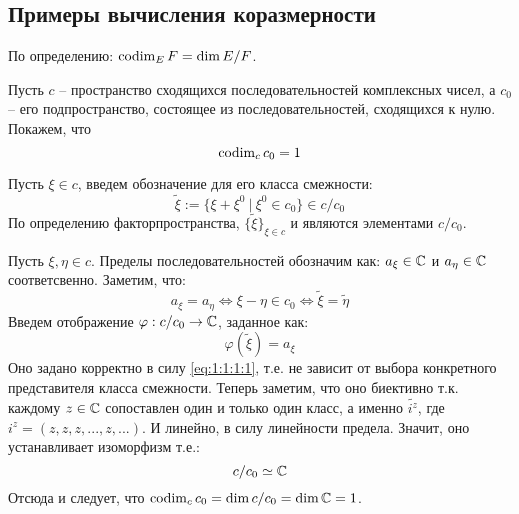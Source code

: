 \documentclass[../main.tex]{subfiles}
\begin{document}
\subsection{Примеры вычисления коразмерности}

По определению: $\operatorname{codim}_E F = \dim{E / F}$. 

\begin{example}
	Пусть $c$ -- пространство сходящихся последовательностей комплексных чисел, а $c_0$ -- его подпространство, состоящее из последовательностей, сходящихся к нулю. Покажем, что
	\begin{equation}
		\operatorname{codim}_{c}{c_0} = 1
	\end{equation}
	
	Пусть $\xi \in c$, введем обозначение для его класса смежности:
	$$\tilde{\xi} := \{\xi + \xi^0 \ | \ \xi^0 \in c_0\} \in c / c_0$$
	По определению факторпространства, $\{\tilde{\xi}\}_{\xi \in c}$ и являются элементами $c / c_0$. 
	
	Пусть $\xi, \eta \in c$. Пределы последовательностей обозначим как: $a_\xi \in \mathbb{C}$ и $a_\eta \in \mathbb{C}$ соответсвенно. Заметим, что:
	\begin{equation}\label{eq:1:1:1:1}
		a_\xi = a_\eta \Leftrightarrow \xi - \eta \in c_0 \Leftrightarrow \tilde{\xi} = \tilde{\eta}
	\end{equation}
	Введем отображение $\varphi : c / c_0 \to \mathbb{C}$, заданное как:
	$$\varphi(\tilde{\xi}) = a_\xi$$
	Оно задано корректно в силу \eqref{eq:1:1:1:1}, т.е. не зависит от выбора конкретного представителя класса смежности. Теперь заметим, что оно биективно т.к. каждому $z \in \mathbb{C}$ сопоставлен один и только один класс, а именно $\tilde{i^z}$, где $i^z = (z, z, z, ..., z, ...)$. И линейно, в силу линейности предела. Значит, оно устанавливает изоморфизм т.е.:
	$$c / c_0 \simeq \mathbb{C}$$
	Отсюда и следует, что $\operatorname{codim}_{c}{c_0} = \dim c / c_0 = \dim \mathbb{C} = 1$.
\end{example}
\end{document}

